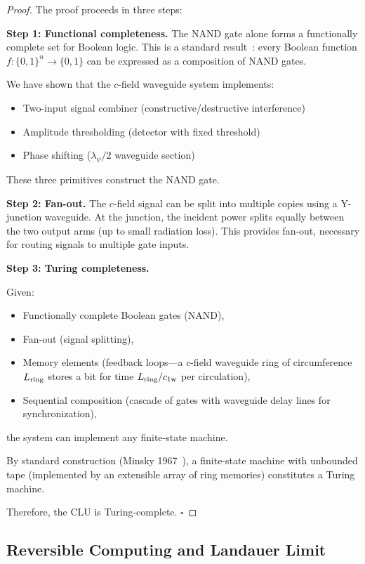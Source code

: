 \documentclass[aps,prd,twocolumn,superscriptaddress,nofootinbib,floatfix]{revtex4-2}
\newcommand{\cfield}{c_{\text{1w}}}
\begin{document}
\begin{proof}
The proof proceeds in three steps:

\textbf{Step 1: Functional completeness.}
The NAND gate alone forms a functionally complete set for
Boolean logic.  This is a standard result~\cite{Enderton2001}:
every Boolean function $f: \{0,1\}^n \to \{0,1\}$ can be
expressed as a composition of NAND gates.

We have shown that the $c$-field waveguide system implements:
\begin{itemize}
\item Two-input signal combiner (constructive/destructive interference)
\item Amplitude thresholding (detector with fixed threshold)
\item Phase shifting ($\lambda_\psi/2$ waveguide section)
\end{itemize}

These three primitives construct the NAND gate.

\textbf{Step 2: Fan-out.}
The $c$-field signal can be split into multiple copies using
a Y-junction waveguide.  At the junction, the incident power
splits equally between the two output arms (up to small
radiation loss).  This provides fan-out, necessary for routing
signals to multiple gate inputs.

\textbf{Step 3: Turing completeness.}

Given:
\begin{itemize}
\item[(a)] Functionally complete Boolean gates (NAND),
\item[(b)] Fan-out (signal splitting),
\item[(c)] Memory elements (feedback loops---a $c$-field waveguide
ring of circumference $L_{\rm ring}$ stores a bit for time
$L_{\rm ring}/\cfield$ per circulation),
\item[(d)] Sequential composition (cascade of gates with
waveguide delay lines for synchronization),
\end{itemize}
the system can implement any finite-state machine.

By standard construction (Minsky 1967~\cite{Minsky1967}),
a finite-state machine with unbounded tape (implemented by
an extensible array of ring memories) constitutes a Turing
machine.

Therefore, the CLU is Turing-complete. $\square$
\end{proof}

\subsection{Reversible Computing and Landauer Limit}
\end{document}
